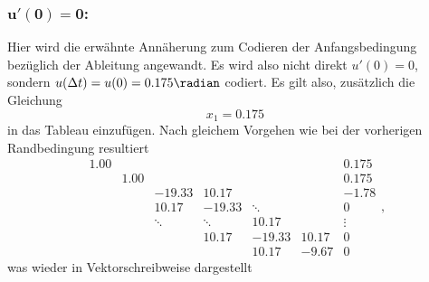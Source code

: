 \subsubsection{$\mathbf{u'(0) = 0 }$:}
Hier wird die erwähnte Annäherung zum Codieren der Anfangsbedingung bezüglich der Ableitung angewandt.
Es wird also nicht direkt $u'(0) = 0 $, sondern $u(\Delta t) = u(0) = 0.175 \radian$ codiert.
Es gilt also, zusätzlich die Gleichung
\begin{equation}
    x_1 = 0.175
\end{equation}
in das Tableau einzufügen.
Nach gleichem Vorgehen wie bei der vorherigen Randbedingung resultiert
\begin{equation}
    \boxed{\begin{matrix}
         1.00  &        &        &        &        &        & 0.175 \\
               &  1.00  &        &        &        &        & 0.175 \\
               &        &-19.33  & 10.17  &        &        & -1.78 \\
               &        & 10.17  &-19.33  & \ddots &        & 0 \\
               &        & \ddots & \ddots & 10.17  &        & \vdots \\
               &        &        & 10.17  &-19.33  & 10.17  & 0 \\
               &        &        &        & 10.17  & -9.67  & 0 
    \end{matrix}},
\end{equation}
was wieder in Vektorschreibweise dargestellt
